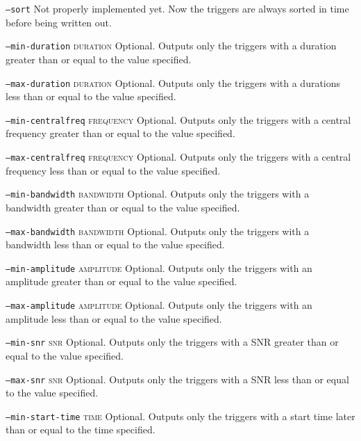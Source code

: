 \begin{entry}
\begin{entry}
\item[\texttt{--sort}]
Not properly implemented yet. Now the triggers are always sorted in time before being written
out.

\item[\texttt{--min-duration} \textsc{duration}]
Optional. Outputs only the triggers with a duration greater than or equal to the value specified.

\item[\texttt{--max-duration} \textsc{duration}]
Optional. Outputs only the triggers with a durations less than or equal to the value specified.

\item[\texttt{--min-centralfreq} \textsc{frequency}]
Optional. Outputs only the triggers with a central frequency greater than or equal to the value specified.

\item[\texttt{--max-centralfreq} \textsc{frequency}]
Optional. Outputs only the triggers with a central frequency less than or equal to the value specified.

\item[\texttt{--min-bandwidth} \textsc{bandwidth}]
Optional. Outputs only the triggers with a bandwidth greater than or equal to the value specified.

\item[\texttt{--max-bandwidth} \textsc{bandwidth}]
Optional. Outputs only the triggers with a bandwidth less than or equal to the value specified.

\item[\texttt{--min-amplitude} \textsc{amplitude}]
Optional. Outputs only the triggers with an amplitude greater than or equal to the value specified.

\item[\texttt{--max-amplitude} \textsc{amplitude}]
Optional. Outputs only the triggers with an amplitude less than or equal to the value specified.

\item[\texttt{--min-snr} \textsc{snr}]
Optional. Outputs only the triggers with a SNR greater than or equal to the value specified.

\item[\texttt{--max-snr} \textsc{snr}]
Optional. Outputs only the triggers with a SNR less than or equal to the value specified.

\item[\texttt{--min-start-time} \textsc{time}]
Optional. Outputs only the triggers with a start time later than or equal to the time specified.


\end{entry}
\end{entry}
